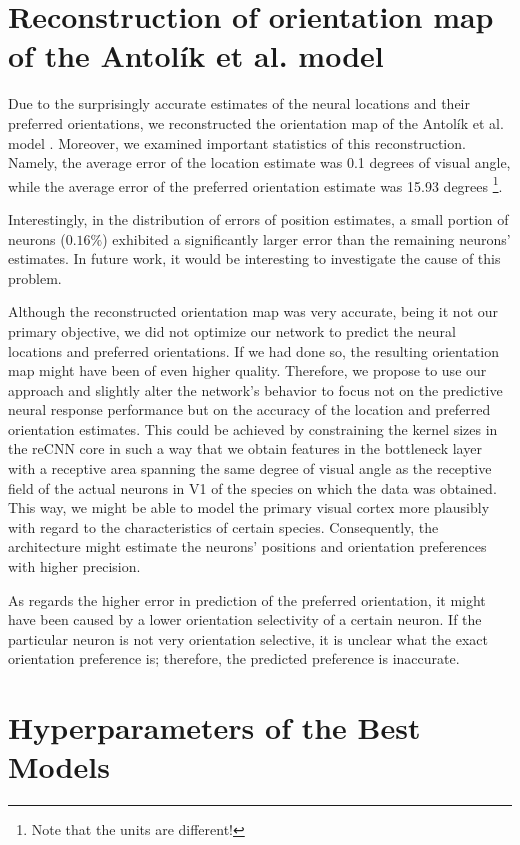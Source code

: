 \section{Reconstruction of orientation map of the Antolík et al. model}

Due to the surprisingly accurate estimates of the neural locations and their preferred orientations, we reconstructed the orientation map of the Antolík et al. model \citep{antolik2019comprehensive}. Moreover, we examined important statistics of this reconstruction. Namely, the average error of the location estimate was 0.1 degrees of visual angle, while the average error of the preferred orientation estimate was 15.93 degrees \footnote{Note that the units are different!}.

Interestingly, in the distribution of errors of position estimates, a small portion of neurons ($0.16 \%$) exhibited a significantly larger error than the remaining neurons' estimates. In future work, it would be interesting to investigate the cause of this problem.

Although the reconstructed orientation map was very accurate, being it not our primary objective, we did not optimize our network to predict the neural locations and preferred orientations. If we had done so, the resulting orientation map might have been of even higher quality. Therefore, we propose to use our approach and slightly alter the network's behavior to focus not on the predictive neural response performance but on the accuracy of the location and preferred orientation estimates. This could be achieved by constraining the kernel sizes in the reCNN core in such a way that we obtain features in the bottleneck layer with a receptive area spanning the same degree of visual angle as the receptive field of the actual neurons in V1 of the species on which the data was obtained. This way, we might be able to model the primary visual cortex more plausibly with regard to the characteristics of certain species. Consequently, the architecture might estimate the neurons’ positions and orientation preferences with higher precision.

As regards the higher error in prediction of the preferred orientation, it might have been caused by a lower orientation selectivity of a certain neuron. If the particular neuron is not very orientation selective, it is unclear what the exact orientation preference is; therefore, the predicted preference is inaccurate.

\section{Hyperparameters of the Best Models}

